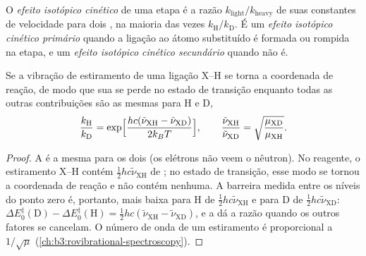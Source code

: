 \begin{definition}\label{def:b3:rate-theories:kie}
O \emph{efeito isotópico cinético} de uma etapa é a
razão $k_{\mathrm{light}}/k_{\mathrm{heavy}}$ de suas constantes de velocidade para dois , na maioria
das vezes $k_{\mathrm H}/k_{\mathrm D}$. É um \emph{efeito isotópico cinético primário}
quando a ligação ao átomo substituído é formada ou rompida na etapa, e um
\emph{efeito isotópico cinético secundário}
quando não é.
\end{definition}

\begin{proposition}\label{prop:b3:rate-theories:primary-kie}
Se a vibração de estiramento de uma ligação X--H se torna a coordenada de reação,
de modo que sua  se perde no estado de transição enquanto
todas as outras contribuições são as mesmas para H e D,
\[
  \frac{k_{\mathrm H}}{k_{\mathrm D}} = \exp\Bigl[\frac{hc(\tilde\nu_{\mathrm{XH}} - \tilde\nu_{\mathrm{XD}})}{2k_BT}\Bigr],
  \qquad \frac{\tilde\nu_{\mathrm{XH}}}{\tilde\nu_{\mathrm{XD}}} = \sqrt{\frac{\mu_{\mathrm{XD}}}{\mu_{\mathrm{XH}}}} .
\]
\end{proposition}

\begin{proof}
A  é a mesma para os dois  (os
elétrons não veem o nêutron). No reagente, o estiramento X--H contém
$\frac12hc\tilde\nu_{\mathrm{XH}}$ de ; no estado de transição, esse modo se tornou
a coordenada de reação e não contém nenhuma. A barreira medida entre os níveis do
ponto zero é, portanto, mais baixa para H de $\frac12hc\tilde\nu_{\mathrm{XH}}$ e para D de $\frac12hc\tilde\nu_{\mathrm{XD}}$: $\Delta E_0^{\ddagger}(\mathrm D) -
\Delta E_0^{\ddagger}(\mathrm H) = \frac12hc(\tilde\nu_{\mathrm{XH}} - \tilde\nu_{\mathrm{XD}})$, e a  dá a razão quando
os outros fatores se cancelam. O número de onda de um estiramento é proporcional a
$1/\sqrt\mu$ (\cref{ch:b3:rovibrational-spectroscopy}).
\end{proof}

